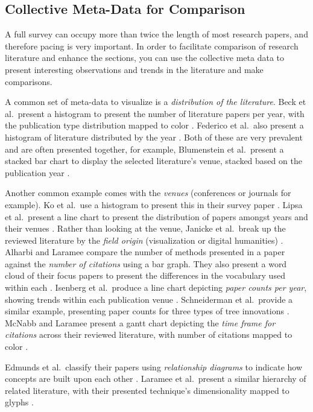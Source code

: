 \subsection{Collective Meta-Data for Comparison}
A full survey can occupy more than twice the length of most research papers, and therefore pacing is very important. In order to facilitate comparison of research literature and enhance the sections, you can use the collective meta data to present interesting observations and trends in the literature and make comparisons.

A common set of meta-data to visualize is a \textit{distribution of the literature}. Beck et al.\ present a histogram to present the number of literature papers per year, with the publication type distribution mapped to color \cite{beck2014state}. Federico et al.\ also present a histogram of literature distributed by the year \cite{federico2016survey}. Both of these are very prevalent and are often presented together, for example, Blumenstein et al.\  present a stacked bar chart to display the selected literature's venue, stacked based on the publication year \cite{blumenstein2016evaluating}. 

Another common example comes with the \textit{venues} (conferences or journals for example). Ko et al.\ use a histogram to present this in their survey paper \cite{ko2016survey}.  Lipsa et al.\ present a line chart to present the distribution of papers amongst years and their venues \cite{lipsa2012visualization}.
Rather than looking at the venue, Janicke et al.\ break up the reviewed literature by the \textit{field origin} (visualization or digital humanities) \cite{janicke2016visual}. Alharbi and Laramee compare the number of methods presented in a paper against the \textit{number of citations} using a bar graph. They also present a word cloud of their focus papers to present the differences in the vocabulary used within each \cite{alharbi2018sos}. Isenberg et al.\ produce a line chart depicting \textit{paper counts per year}, showing trends within each publication venue \cite{isenberg2017VPD}. Schneiderman et al.\ provide a similar example, presenting paper counts for three types of tree innovations \cite{schneiderman2012innovation}.
McNabb and Laramee present a gantt chart depicting the \textit{time frame for citations} across their reviewed literature, with number of citations mapped to color \cite{mcnabb2017sos}. 

Edmunds et al.\ classify their papers using \textit{relationship diagrams} to indicate how concepts are built upon each other \cite{edmunds2012surface}. Laramee et al.\ present a similar hierarchy of related literature, with their presented technique's dimensionality mapped to glyphs \cite{laramee2004state}.

